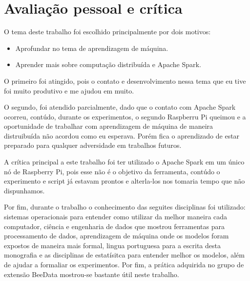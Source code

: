 
\chapter{Avaliação pessoal e crítica}
\label{cap:avaliacao_pessoal}

O tema deste trabalho foi escolhido principalmente por dois motivos:

\begin{itemize}
    \item Aprofundar no tema de aprendizagem de máquina.
    \item Aprender mais sobre computação distribuída e Apache Spark.
\end{itemize}

O primeiro foi atingido, pois o contato e desenvolvimento nessa tema que eu tive
foi muito produtivo e me ajudou em muito.

O segundo, foi atendido parcialmente, dado que o contato com Apache Spark ocorreu,
contúdo, durante os experimentos, o segundo Raspberru Pi queimou e a oportunidade de 
trabalhar com aprendizagem de máquina de maneira distruibuída não acordou como eu 
esperava. Porém fica o aprendizado de estar preparado para qualquer adversidade em
trabalhos futuros.

A crítica principal a este trabalho foi ter utilizado o Apache Spark em um único nó 
de Raspberry Pi, pois esse não é o objetivo da ferramenta, contúdo o experimento e 
script já estavam prontos e alterla-los nos tomaria tempo que não dispunhamos. 

Por fim, durante o trabalho o conhecimento das seguites disciplinas foi utilizado: sistemas
operacionais para entender como utilizar da melhor maneira cada computador, ciência e engenharia
de dados que mostrou ferramentas para processamento de dados, aprendizagem de máquina onde os 
modelos foram expostos de maneira mais formal, lingua portuguesa para a escrita desta monografia
e as disciplinas de estatísitca para entender melhor os modelos, além de ajudar a formaliar os 
experimentos. Por fim, a prática adquirida no grupo de extensão BeeData mostrou-se bastante útil 
neste trabalho.
